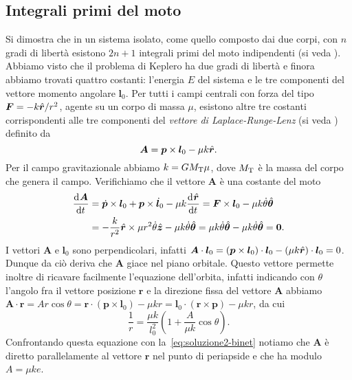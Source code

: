 {\subsection{Integrali primi del moto}
\label{sec:integrali-primi}

Si dimostra che in un sistema isolato, come quello composto dai due corpi, con
$n$ gradi di libertà esistono $2n+1$ integrali primi del moto indipendenti (si
veda \textcite[42]{landau:meccanica}). Abbiamo visto che il problema di Keplero
ha due gradi di libertà e finora abbiamo trovati quattro costanti: l'energia $E$
del sistema e le tre componenti del vettore momento angolare $\bm{l}_0$. Per
tutti i campi centrali con forza del tipo $\bm{F} = -k\hat{\bm{r}}/r^2$, agente su
un corpo di massa $\mu$, esistono altre tre costanti corrispondenti alle tre
componenti del \emph{vettore di Laplace-Runge-Lenz} (si veda
\textcite[98]{goldstein:meccanica}) definito da
\begin{equation}
  \bm{A} = \bm{p}\times\bm{l}_0 - \mu k\hat{\bm{r}}.
\end{equation}
Per il campo gravitazionale abbiamo $k=GM_\textup{T}\mu$, dove $M_\textup{T}$ è
la massa del corpo che genera il campo. Verifichiamo che il vettore $\bm{A}$ è
una costante del moto
\begin{equation}
  \begin{split}
    \frac{{\mathop{}\!\mathrm{d}^{}}\bm{A}}{\mathop{}\!\mathrm{d} {t}^{}} &= \dot{\bm{p}}\times\bm{l}_0 + \bm{p}\times\dot{\bm{l}}_0
    - \mu k\frac{{\mathop{}\!\mathrm{d}^{}}\hat{\bm{r}}}{\mathop{}\!\mathrm{d} {t}^{}} = \bm{F}\times\bm{l}_0 - \mu
    k\dot{\theta}\hat{\bm{\theta}} \\
    &= -\frac{k}{r^2}\hat{\bm{r}}\times \mu r^2\dot{\theta}\hat{\bm{z}} -
    \mu k\dot{\theta}\hat{\bm{\theta}} = \mu k\dot{\theta}\hat{\bm{\theta}} -
    \mu k\dot{\theta}\hat{\bm{\theta}} = \bm{0}.
  \end{split}
\end{equation}
I vettori $\bm{A}$ e $\bm{l}_0$ sono perpendicolari, infatti
$\bm{A}\cdot\bm{l}_0 = (\bm{p}\times\bm{l}_0)\cdot\bm{l}_0 - (\mu
k\hat{\bm{r}})\cdot\bm{l}_0 = 0$.
Dunque da ciò deriva che $\bm{A}$ giace nel piano orbitale. Questo vettore
permette inoltre di ricavare facilmente l'equazione dell'orbita, infatti
indicando con $\theta$ l'angolo fra il vettore posizione $\bm{r}$ e la direzione
fissa del vettore $\bm{A}$ abbiamo
$\bm{A}\cdot\bm{r} = Ar\cos\theta = \bm{r}\cdot(\bm{p}\times\bm{l}_0) - \mu kr =
\bm{l}_0\cdot(\bm{r}\times\bm{p}) - \mu kr$, da cui
\begin{equation}
  \frac{1}{r} = \frac{\mu k}{l_0^2}
  \left(
    1 + \frac{A}{\mu k}\cos\theta
  \right).
\end{equation}
Confrontando questa equazione con la~\eqref{eq:soluzione2-binet} notiamo che
$\bm{A}$ è diretto parallelamente al vettore $\bm{r}$ nel punto di periapside e
che ha modulo $A = \mu ke$.

}

